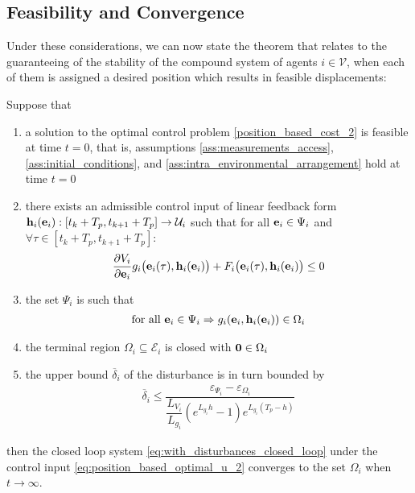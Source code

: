 \subsection{Feasibility and Convergence}

Under these considerations, we can now state the theorem that relates to
the guaranteeing of the stability of the compound system of agents
$i \in \mathcal{V}$, when each of them is assigned a desired
position which results in feasible displacements:\\[2.5ex]

\begin{bw_box}
\begin{theorem}
  \label{theorem:with_disturbances}
  Suppose that

  \begin{enumerate}
    \item a solution to the optimal control problem \eqref{position_based_cost_2}
      is feasible at time $t=0$, that is, assumptions
      \eqref{ass:measurements_access}, \eqref{ass:initial_conditions}, and
      \eqref{ass:intra_environmental_arrangement} hold at time $t=0$
    \item there exists an admissible control input of linear feedback form
      $\bm{\mathbf{h}}_i(\bm{\mathbf{e}}_i) : [t_k + T_p, t_{k+1} + T_p] \to \mathcal{U}_i$
      such that for all $\bm{\mathbf{e}}_i \in \Psi_i$ and $\forall \tau \in
      [t_k + T_p, t_{k+1} + T_p]$:
      \begin{align}
        \dfrac{\partial V_i}{\partial \bm{\mathbf{e}}_i} g_i\big(\bm{\mathbf{e}}_i(\tau), \bm{\mathbf{h}}_i(\bm{\mathbf{e}}_i)\big)
          + F_i\big(\bm{\mathbf{e}}_i(\tau), \bm{\mathbf{h}}_i(\bm{\mathbf{e}}_i)\big) \leq 0
      \end{align}
    \item the set $\Psi_i$ is such that
      \begin{align}
        \text{for all } \bm{\mathbf{e}}_i \in \Psi_i \Rightarrow g_i(\bm{\mathbf{e}}_i, \bm{\mathbf{h}}_i(\bm{\mathbf{e}}_i)) \in \Omega_i
      \end{align}
    \item the terminal region $\Omega_i \subseteq \mathcal{E}_i$ is
      closed with $\bm{\mathbf{0}} \in \Omega_i$
    \item the upper bound $\overline{\delta}_i$ of the disturbance is in turn bounded by
      \begin{align}
        \overline{\delta}_i \leq \dfrac{\varepsilon_{\Psi_i} - \varepsilon_{\Omega_i}}{\dfrac{L_{V_i}}{L_{g_i}} (e^{L_{g_i}h} - 1) e^{L_{g_i} (T_p - h)}}
      \end{align}

  \end{enumerate}

  then the closed loop system \eqref{eq:with_disturbances_closed_loop} under
  the control input \eqref{eq:position_based_optimal_u_2} converges to the set
  $\Omega_i$ when $t \to \infty$.
\end{theorem}
\end{bw_box}

